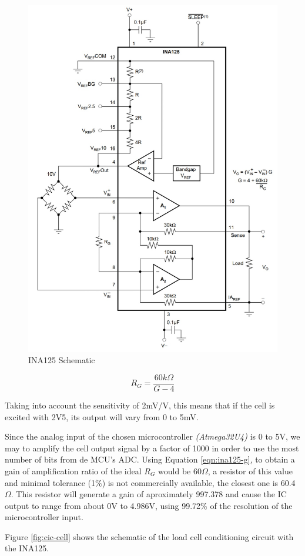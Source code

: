 	\begin{figure}[htbp]
		\centering
		\includegraphics[scale=1.2]{figuras/fig-ina125-functional-block}
		\caption{INA125 Schematic \cite{ina125}}
		\label{fig:ina125-functional-block}
	\end{figure}

	\begin{equation}\label{eqn:ina125-g}
		R_{G}=\frac{60k\Omega}{G - 4}
	\end{equation}

	Taking into account the sensitivity of 2mV/V, this means that if the cell is excited with 2V5, its output will vary from 0 to 5mV.
	\par
	Since the analog input of the chosen microcontroller \textit{(Atmega32U4)} is 0 to 5V, we may to amplify the cell output signal by a factor of 1000 in order to use the most number of bits from de MCU's ADC. Using Equation \ref{eqn:ina125-g}, to obtain a gain of amplification ratio of the ideal $R_{G}$ would be 60$\Omega$, a resistor of this value and minimal tolerance (1$\%$) is not commercially available, the closest one is 60.4$\Omega$. This resistor will generate a gain of aproximately 997.378 and cause the IC output to range from about 0V to 4.986V, using 99.72\% of the resolution of the microcontroller input. 
	\par
	Figure \ref{fig:cic-cell} shows the schematic of the load cell conditioning circuit with the INA125.

